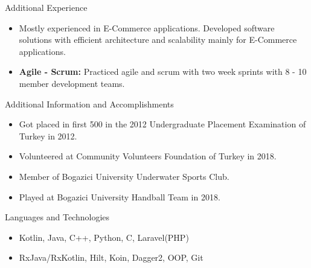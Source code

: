 \documentclass[]{mcdowellcv}
\begin{document}
	\begin{cvsection}{Additional Experience}
		\begin{cvsubsection}{}{}{}
			\begin{itemize}
				\item Mostly experienced in E-Commerce applications. Developed software solutions with efficient architecture and scalability mainly for E-Commerce applications.
				\item \textbf{Agile - Scrum:} Practiced agile and scrum with two week sprints with 8 - 10 member development teams.
			\end{itemize}
		\end{cvsubsection}
	\end{cvsection}
	
	\begin{cvsection}{Additional Information and Accomplishments}
		\begin{cvsubsection}{}{}{}	
			\begin{itemize}
				\item Got placed in first 500 in the 2012 Undergraduate Placement Examination of Turkey in 2012.
			    \item Volunteered at Community Volunteers Foundation of Turkey in 2018.
			    \item Member of Bogazici University Underwater Sports Club.
			    \item Played at Bogazici University Handball Team in 2018.
			\end{itemize}
		\end{cvsubsection}
	\end{cvsection}
	
	\begin{cvsection}{Languages and Technologies}
		\begin{cvsubsection}{}{}{}	
			\begin{itemize}
				\item Kotlin, Java, C++, Python, C, Laravel(PHP)
				\item RxJava/RxKotlin, Hilt, Koin, Dagger2, OOP, Git
			\end{itemize}
		\end{cvsubsection}
	\end{cvsection}
	
\end{document}
